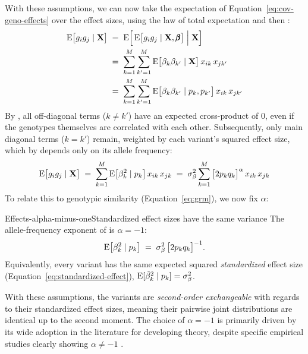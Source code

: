 \documentclass[12pt]{article}
\numberwithin{equation}{section}
\begin{document}
With these assumptions, we can now take the expectation of Equation~\eqref{eq:cov-geno-effects} over the effect sizes, using the law of total expectation and then :
\begin{equation}\label{eq:cov-geno-sum}
\begin{aligned}
    \mathrm{E}\big[g_i g_j \mid \mathbf{X}\big]
    \;&=\; \mathrm{E}\Big[\, \mathrm{E}\big[g_i g_j \mid \mathbf{X}, \pmb{\beta}\big] \;\Big|\; \mathbf{X} \Big] \\
    \;&=\; \sum_{k=1}^{M} \sum_{k'=1}^{M} \mathrm{E}\big[\beta_k \beta_{k'} \mid \mathbf{X}\big]\, x_{ik}\, x_{jk'} \\
    \;&=\; \sum_{k=1}^{M} \sum_{k'=1}^{M} \mathrm{E}\big[\beta_k \beta_{k'} \mid p_k, p_{k'}\big]\, x_{ik}\, x_{jk'}
\end{aligned}
\end{equation}
By , all off-diagonal terms ($k\neq k'$) have an expected cross-product of 0, even if the genotypes themselves are correlated with each other.
Subsequently, only main diagonal terms ($k = k'$) remain, weighted by each variant's squared effect size, which by  depends only on its allele frequency:
\begin{equation}\label{eq:cov-geno-diag}
    \mathrm{E}\big[g_i g_j \mid \mathbf{X}\big] \;=\; \sum_{k=1}^{M} \mathrm{E}\big[\beta_k^2 \mid p_k\big]\, x_{ik}\, x_{jk}
    \;=\; \sigma_\beta^2 \sum_{k=1}^{M} \big[2p_k q_k\big]^{\alpha}\, x_{ik}\, x_{jk}
\end{equation}
To relate this to genotypic similarity (Equation~\eqref{eq:grm}), we now fix $\alpha$:

\begin{assumption}{Effects-alpha-minus-one}{Standardized effect sizes have the same variance}
The allele-frequency exponent of  is $\alpha = -1$:
$$ \mathrm{E}\big[\beta_k^2 \mid p_k\big] \;=\; \sigma_\beta^2 \, \big[2p_k q_k\big]^{-1} . $$
Equivalently, every variant has the same expected squared \emph{standardized} effect size (Equation~\eqref{eq:standardized-effect}), $\mathrm{E}[\tilde{\beta}_k^2 \mid p_k] = \sigma_\beta^2$.
\end{assumption}

With these assumptions, the variants are \emph{second-order exchangeable} with regards to their standardized effect sizes, meaning their pairwise joint distributions are identical up to the second moment.
The choice of $\alpha = -1$ is primarily driven by its wide adoption in the literature for developing theory, despite specific empirical studies clearly showing $\alpha \neq -1$ \citep{Schoech2019NatComm}.
\end{document}
